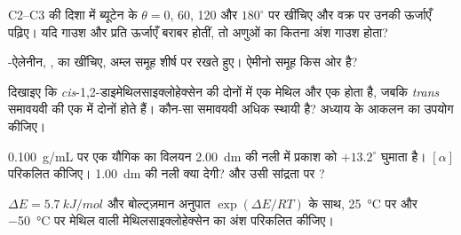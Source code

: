 \begin{exercise}[$\star\star$]\label{exo:b1:stereochemistry-in-depth:5}
C2--C3 की दिशा में ब्यूटेन के  $\theta = 0$, 60,
120 और $180^\circ$ पर खींचिए और वक्र पर उनकी ऊर्जाएँ पढ़िए। यदि गाउश और प्रति
ऊर्जाएँ बराबर होतीं, तो अणुओं का कितना अंश गाउश होता?
\end{exercise}

\begin{exercise}[$\star\star$]\label{exo:b1:stereochemistry-in-depth:6}
-ऐलेनीन, , का  खींचिए,
अम्ल समूह शीर्ष पर रखते हुए। ऐमीनो समूह
किस ओर है?
\end{exercise}

\begin{exercise}[$\star\star$]\label{exo:b1:stereochemistry-in-depth:7}
दिखाइए कि \textit{cis}-1,2-डाइमेथिलसाइक्लोहेक्सेन की दोनों  में एक मेथिल  और
एक  होता है, जबकि \textit{trans} समावयवी की एक
 में दोनों  होते हैं। कौन-सा समावयवी अधिक स्थायी है? अध्याय के
आकलन का उपयोग कीजिए।
\end{exercise}

\begin{exercise}[$\star\star$]\label{exo:b1:stereochemistry-in-depth:8}
\qty{0.100}{g/mL} पर एक  यौगिक का विलयन \qty{2.00}{dm} की
नली में प्रकाश को $+13.2^\circ$ घुमाता है। $[\alpha]$ परिकलित कीजिए। \qty{1.00}{dm} की
नली क्या देगी? और उसी सांद्रता पर ?
\end{exercise}

\begin{exercise}[$\star\star$]\label{exo:b1:stereochemistry-in-depth:9}
$\Delta E = \qty{5.7}{kJ/mol}$ और बोल्ट्ज़मान अनुपात
$\exp(\Delta E/RT)$ के साथ, \qty{25}{\celsius} पर और \qty{-50}{\celsius} पर 
मेथिल वाली मेथिलसाइक्लोहेक्सेन  का अंश परिकलित कीजिए।
\end{exercise}

